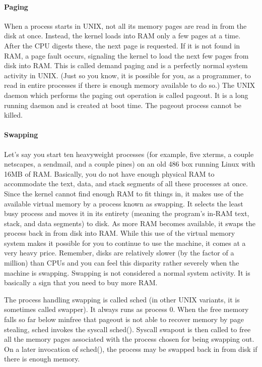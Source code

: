 \documentclass{article}
\begin{document}
\paragraph{Paging}When a process starts in UNIX, not all its memory pages are read in from the disk at once. Instead, the kernel loads into RAM only a few pages at a time. After the
CPU digests these, the next page is requested. If it is not found in RAM, a page fault occurs, signaling the kernel to load the next few pages from disk into RAM. This is called demand paging and is a perfectly normal system activity in UNIX. (Just so you know, it is possible for you, as a programmer, to read in entire processes if there is enough memory available to do so.) The UNIX daemon which performs the paging out operation is called pageout. It is a long running daemon and is created at boot time. The pageout process cannot be killed.

\paragraph{Swapping}Let’s say you start ten heavyweight processes (for example, five xterms, a couple netscapes, a sendmail, and a couple pines) on an old 486 box running Linux with 16MB of RAM. Basically, you do not have enough physical RAM to accommodate the text, data, and stack segments of all these processes at once. Since the kernel cannot find enough RAM to fit things in, it makes use of the available virtual memory by a process known as swapping. It selects the least busy process and moves it in its entirety (meaning the program's in-RAM text, stack, and data segments) to disk. As more RAM becomes available, it swaps the process back in from disk into RAM. While this use of the virtual memory system makes it possible for you to continue to use the machine, it comes at a very heavy price. Remember, disks are relatively slower (by the factor of a million) than CPUs and you can feel this disparity rather severely when the machine is swapping. Swapping is not considered a normal system activity. It is basically a sign that you need to buy more RAM.

The process handling swapping is called sched (in other UNIX variants, it is
sometimes called swapper). It always runs as process 0. When the free memory falls
so far below minfree that pageout is not able to recover memory by page stealing,
sched invokes the syscall sched(). Syscall swapout is then called to free all the
memory pages associated with the process chosen for being swapping out. On a later
invocation of sched(), the process may be swapped back in from disk if there is
enough memory.
\end{document}
